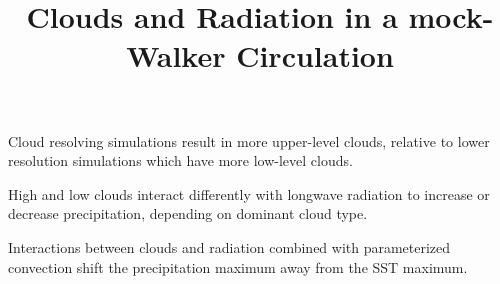 \documentclass[draft]{agujournal2019}
\begin{document}
\title{Clouds and Radiation in a mock-Walker Circulation}



\begin{keypoints}
  \item{Cloud resolving simulations result in more upper-level clouds, relative to lower resolution simulations which have more low-level clouds.}
  \item{High and low clouds interact differently with longwave radiation to increase or decrease precipitation, depending on  dominant cloud type.}
  \item{Interactions between clouds and radiation combined with parameterized convection shift the precipitation maximum away from the SST maximum.}
\end{keypoints}
\end{document}
